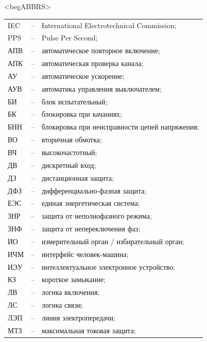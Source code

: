 \color{unimain}\section*{}
{\color{white}\fontsize{0.1pt}{0.1pt}\selectfont<begABBRS>}
\color{black}
\begin{longtable}{>{\raggedright\arraybackslash}m{2cm}>{\raggedright\arraybackslash}m{0.5cm}>{\raggedright\arraybackslash}m{20cm}}
\endfirsthead\endhead\endfoot\endlastfoot
IEC & -- &  International Electrotechnical Commission; \\
PPS & -- & Pulse Per Second; \\
АПВ & -- & автоматическое повторное включение; \\
АПК & -- & автоматическая проверка канала; \\
АУ & -- & автоматическое ускорение; \\
АУВ & -- & автоматика управления выключателем; \\
БИ & -- & блок испытательный; \\
БК & -- & блокировка при качаниях; \\
БНН & -- & блокировка при неисправности цепей напряжения; \\
ВО & -- & вторичная обмотка; \\
ВЧ & -- & высокочастотный; \\
ДВ & -- & дискретный вход; \\
ДЗ & -- & дистанционная защита; \\
ДФЗ & -- & дифференциально-фазная защита; \\
ЕЭС & -- & единая энергетическая система; \\
ЗНР & -- & защита от неполнофазного режима; \\
ЗНФ & -- & защита от непереключения фаз; \\
ИО & -- & измерительный орган / избирательный орган; \\
ИЧМ & -- & интерфейс человек-машина; \\
ИЭУ & -- & интеллектуальное электронное устройство; \\
КЗ & -- & короткое замыкание; \\
ЛВ & -- & логика включения; \\
ЛС & -- & логика связи; \\
ЛЭП & -- & линия электропередачи; \\
МТЗ & -- & максимальная токовая защита; \\

\end{longtable}
